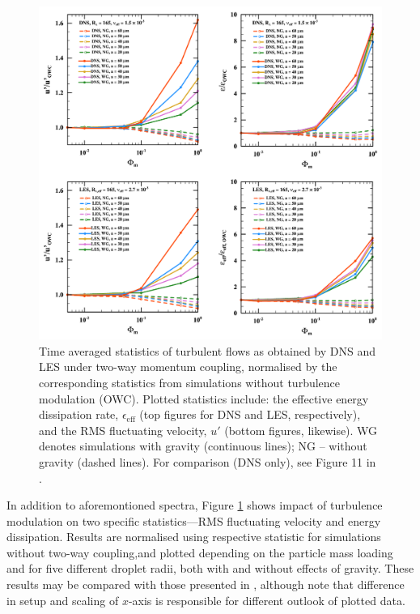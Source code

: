 \documentclass{pracamgren}
\begin{document}
\begin{figure}[ht]
\centering
\includegraphics[width=13.5cm]{figures/2-05_modstat.pdf}
\caption{
Time averaged statistics of turbulent flows as obtained by DNS and LES under two-way momentum coupling, normalised by the corresponding statistics from simulations without turbulence modulation (OWC).
Plotted statistics include: the effective energy dissipation rate, $\epsilon_{\text{eff}}$ (top figures for DNS and LES, respectively), and the RMS fluctuating velocity, $u'$ (bottom figures, likewise).
WG denotes simulations with gravity (continuous lines); NG -- without gravity (dashed lines).
For comparison (DNS only), see Figure 11 in \textcite{Rosa2020}.
}
\label{fig:modstat}
\end{figure}

In addition to aforemontioned spectra, Figure \ref{fig:modstat} shows impact of turbulence modulation on two specific statistics---RMS fluctuating velocity and energy dissipation.
Results are normalised using respective statistic for simulations without two-way coupling,and plotted depending on the particle mass loading and for five different droplet radii, both with and without effects of gravity.
These results may be compared with those presented in \textcite[Figure 11 therein]{Rosa2020}, although note that difference in setup and scaling of $x$-axis is responsible for different outlook of plotted data.
\end{document}
